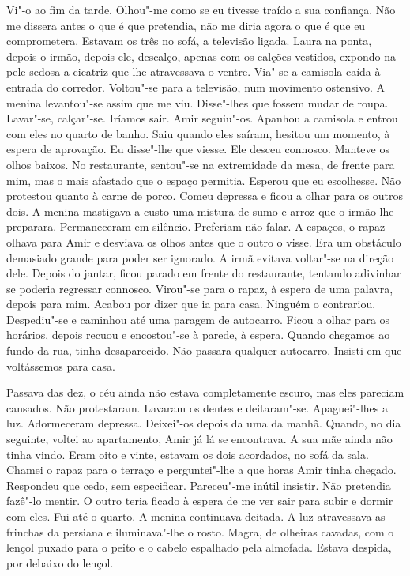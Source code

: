 Vi"-o ao fim da tarde. Olhou"-me como se eu tivesse traído a sua
confiança. Não me dissera antes o que é que pretendia, não me diria
agora o que é que eu comprometera. Estavam os três no sofá, a televisão
ligada. Laura na ponta, depois o irmão, depois ele, descalço, apenas com
os calções vestidos, expondo na pele sedosa a cicatriz que lhe
atravessava o ventre. Via"-se a camisola caída à entrada do corredor.
Voltou"-se para a televisão, num movimento ostensivo. A menina
levantou"-se assim que me viu. Disse"-lhes que fossem mudar de roupa.
Lavar"-se, calçar"-se. Iríamos sair. Amir seguiu"-os. Apanhou a camisola
e entrou com eles no quarto de banho. Saiu quando eles saíram, hesitou
um momento, à espera de aprovação. Eu disse"-lhe que viesse. Ele desceu
connosco. Manteve os olhos baixos. No restaurante, sentou"-se na
extremidade da mesa, de frente para mim, mas o mais afastado que o
espaço permitia. Esperou que eu escolhesse. Não protestou quanto à carne
de porco. Comeu depressa e ficou a olhar para os outros dois. A menina
mastigava a custo uma mistura de sumo e arroz que o irmão lhe preparara.
Permaneceram em silêncio. Preferiam não falar. A espaços, o rapaz olhava
para Amir e desviava os olhos antes que o outro o visse. Era um
obstáculo demasiado grande para poder ser ignorado. A irmã evitava
voltar"-se na direção dele. Depois do jantar, ficou parado em frente do
restaurante, tentando adivinhar se poderia regressar connosco. Virou"-se
para o rapaz, à espera de uma palavra, depois para mim. Acabou por dizer
que ia para casa. Ninguém o contrariou. Despediu"-se e caminhou até uma
paragem de autocarro. Ficou a olhar para os horários, depois recuou e
encostou"-se à parede, à espera. Quando chegamos ao fundo da rua, tinha
desaparecido. Não passara qualquer autocarro. Insisti em que voltássemos
para casa.

Passava das dez, o céu ainda não estava completamente escuro, mas eles
pareciam cansados. Não protestaram. Lavaram os dentes e deitaram"-se.
Apaguei"-lhes a luz. Adormeceram depressa. Deixei"-os depois da uma da
manhã. Quando, no dia seguinte, voltei ao apartamento, Amir já lá se
encontrava. A sua mãe ainda não tinha vindo. Eram oito e vinte, estavam
os dois acordados, no sofá da sala. Chamei o rapaz para o terraço e
perguntei"-lhe a que horas Amir tinha chegado. Respondeu que cedo, sem
especificar. Pareceu"-me inútil insistir. Não pretendia fazê"-lo mentir.
O outro teria ficado à espera de me ver sair para subir e dormir com
eles. Fui até o quarto. A menina continuava deitada. A luz atravessava
as frinchas da persiana e iluminava"-lhe o rosto. Magra, de olheiras
cavadas, com o lençol puxado para o peito e o cabelo espalhado pela
almofada. Estava despida, por debaixo do lençol.

